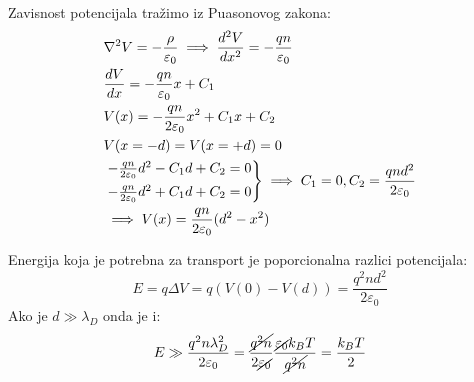 \documentclass[fleqn]{report}
\begin{document}
\begin{enumerate}
          \noindent\hfill
          \hfill\null\\
          Zavisnost potencijala tražimo iz Puasonovog zakona:
          \begin{align*}
               & \nabla^2 V = -\frac{\rho}{\varepsilon_0} \implies \frac{d^2 V}{dx^2} = -\frac{qn}{\varepsilon_0} \\
               & \frac{dV}{dx} = -\frac{qn}{\varepsilon_0}x + C_1                                                 \\
               & V(x) = - \frac{qn}{2\varepsilon_0} x^2 + C_1 x + C_2                                             \\
               & V(x = -d) = V(x = +d) = 0                                                                        \\
               & \begin{rcases}
                     -\frac{qn}{2\varepsilon_0}d^2 - C_1 d + C_2 = 0 \\
                     -\frac{qn}{2\varepsilon_0}d^2 + C_1 d + C_2 = 0
                 \end{rcases} \implies C_1 = 0, C_2 = \frac{qnd^2}{2\varepsilon_0}                                \\
               & \implies V(x) = \frac{qn}{2\varepsilon_0}(d^2 - x^2)
          \end{align*}

          Energija koja je potrebna za transport je poporcionalna razlici potencijala:
          \[ E = q\Delta V = q(V(0) - V(d)) = \frac{q^2nd^2}{2\varepsilon_0} \]
          Ako je $d \gg \lambda_D$ onda je i:
          \[ E \gg \frac{q^2n\lambda_D^2}{2\varepsilon_0} = \frac{\cancel{q^2n}}{2\cancel{\varepsilon_0}} \frac{\cancel{\varepsilon_0} k_B T}{\cancel{q^2n}} = \frac{k_B T}{2} \]


\end{enumerate}
\end{document}

